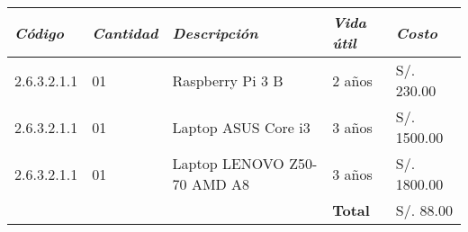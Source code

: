             \begin{table}[h!]
                \centering
                \begin{tabular}{|p{2cm}|p{1.8cm}|p{3.8cm}|p{1.8cm}|p{2cm}|} \hline
                    
                
                \textit{{\bf{Código}}} &
                \textit{{\bf{Cantidad}}} &
                \textit{{\bf{Descripción}}} &
                \textit{{\bf{Vida útil}}}  &
                \textit{{\bf{Costo}}}
                \\ \hline

                2.6.3.2.1.1 &
                01 &
                Raspberry Pi 3 B &
                2 años &
                S/. 230.00
                \\ \hline

                2.6.3.2.1.1 &
                01 &
                Laptop ASUS Core i3 &
                3 años &
                S/. 1500.00
                \\ \hline

                2.6.3.2.1.1&
                01 &
                Laptop LENOVO Z50-70 AMD A8 &
                3 años &
                S/. 1800.00
                \\ \hline

                &
                &
                &
                \bf{Total} &
                S/. 88.00
                \\ \hline

                \end{tabular}
            \end{table}
